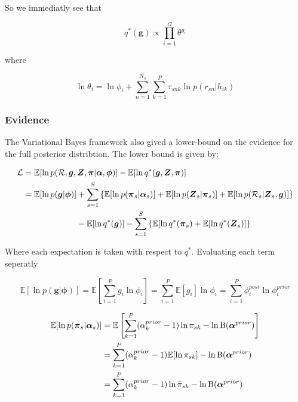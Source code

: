 \documentclass{article}
\begin{document}
So we immediatly see that

\begin{equation}
\label{eq:cnv_q_g}
q^*(\boldsymbol{g}) \propto \prod_{i = 1}^G \theta^{g_i}
\end{equation}

where

\begin{equation}
\label{eq:cnv_theta}
\ln \theta_i = \ln \phi_i + \sum_{n = 1}^{N_s} \sum_{k = 1}^P \tau_{snk} \ln p(r_{sn} | h_{ik})
\end{equation}

\subsubsection{Evidence}

The Variational Bayes framework also gived a lower-bound on the evidence for the full posterior distribtion. The lower bound is given by:

\begin{align}
\label{eq:cnv_evidence}
\begin{split}
\mathcal{L} &= \mathbb{E}[\ln p(\mathcal{R}, \boldsymbol{g}, \boldsymbol{Z}, \boldsymbol{\pi} | \boldsymbol{\alpha}, \boldsymbol{\phi})] - \mathbb{E} [\ln q^*(\boldsymbol{g}, \boldsymbol{Z}, \boldsymbol{\pi})] \\
&= \mathbb{E}[\ln p(\boldsymbol{g} | \boldsymbol{\phi})] + \sum_{s = 1}^S \left\{ \mathbb{E}[\ln p(\boldsymbol{\pi}_s | \boldsymbol{\alpha}_s)] + \mathbb{E}[\ln p(\boldsymbol{Z}_s | \boldsymbol{\pi}_s)] + \mathbb{E}[\ln p(\mathcal{R}_s | \boldsymbol{Z}_s, \boldsymbol{g})] \right\} \notag \\
     &\phantom{{}=\mathbb{E}[\ln p(\boldsymbol{g} | \boldsymbol{\phi})] } - \mathbb{E}[\ln q^*(\boldsymbol{g})] - \sum_{s = 1}^S \left\{ \mathbb{E}[\ln q^*(\boldsymbol{\pi}_s) + \mathbb{E}[\ln q^*(\boldsymbol{Z}_s)] \right\}
\end{split}
\end{align}

Where each expectation is taken with respect to $q^*$. Evaluating each term seperatly

\begin{equation}
\mathbb{E}[\ln p(\boldsymbol{g} | \boldsymbol{\phi})] = \mathbb{E}\left[\sum_{i = 1}^P g_i \ln \phi_i\right] = \sum_{i = 1}^P \mathbb{E}[g_i] \ln \phi_i = \sum_{i = 1}^P \phi_i^{post} \ln \phi_i^{prior}
\end{equation}

\begin{align}
\mathbb{E}[\ln p(\boldsymbol{\pi}_s | \boldsymbol{\alpha}_s)] &= \mathbb{E}\left[\sum_{k = 1}^P (\alpha_k^{prior} - 1) \ln \pi_{sk} - \ln \text{B}(\boldsymbol{\alpha}^{prior})\right] \notag \\ 
&= \sum_{k = 1}^P (\alpha_k^{prior} - 1) \mathbb{E} [\ln \pi_{sk}] - \ln \text{B}(\boldsymbol{\alpha}^{prior}) \notag \\
 &= \sum_{k = 1}^P (\alpha_k^{prior} - 1) \ln \tilde{\pi}_{sk} - \ln \text{B}(\boldsymbol{\alpha}^{prior})
\end{align}
\end{document}
